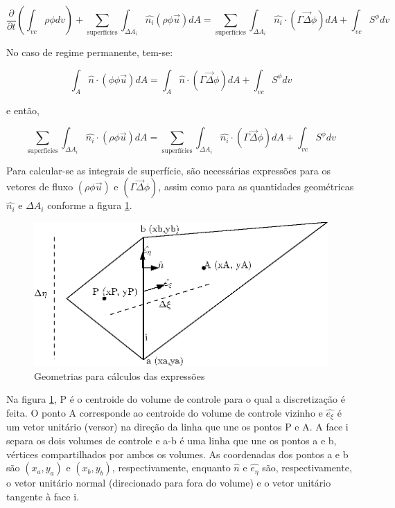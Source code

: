 \begin{equation}
    \label{eq:6.8}
    \frac{\partial}{\partial t}(\int_{vc}\rho \phi dv) + \sum_{\text{superfícies}} \int_{\Delta A_i} \hat{n_i} (\rho \phi \vec{u}) dA= \sum_{\text{superfícies}} \int_{\Delta A_i} \hat{n_i} \cdot (\Gamma \vec{\Delta} \phi) dA + \int_{vc} S^\phi dv
\end{equation}

No caso de regime permanente, tem-se:

\begin{equation}
    \label{eq:6.9}
    \int_A \hat{n} \cdot (\phi \phi \vec{u}) dA = \int_A \hat{n} \cdot (\Gamma \vec{\Delta} \phi) dA + \int_{vc} S^\phi dv
\end{equation}

e então,

\begin{equation}
    \label{eq:6.10}
    \sum_{\text{superfícies}} \int_{\Delta A_i} \hat{n_i} \cdot (\rho \phi \vec{u}) dA = \sum_{\text{superfícies}} \int_{\Delta A_i} \hat{n_i} \cdot (\Gamma \vec{\Delta} \phi) dA + \int_{vc} S^\phi dv
\end{equation}

Para calcular-se as integrais de superfície, são necessárias expressões para os vetores de fluxo $(\rho \phi \vec{u})$ e $(\Gamma \vec{\Delta} \phi)$, assim como para as quantidades geométricas $\hat{n_i}$ e $\Delta A_i$ conforme a figura \ref{fig:geometrias}.

\begin{figure}[h]
    \centering
    \includegraphics{fig/geometrias.eps}
    \caption{Geometrias para cálculos das expressões}
    \label{fig:geometrias}
\end{figure}

Na figura \ref{fig:geometrias}, P é o centroide do volume de controle para o qual a discretização é feita. O ponto A corresponde ao centroide do volume de controle vizinho e $\hat{e_\xi}$ é um vetor unitário (versor) na direção da linha que une os pontos P e A. A face i separa os dois volumes de controle e a-b é uma linha que une os pontos a e b, vértices compartilhados por ambos os volumes. As coordenadas dos pontos a e b são $(x_a, y_a)$ e $(x_b, y_b)$, respectivamente, enquanto $\hat{n}$ e $\hat{e_\eta}$ são, respectivamente, o vetor unitário normal (direcionado para fora do volume) e o vetor unitário tangente à face i.

